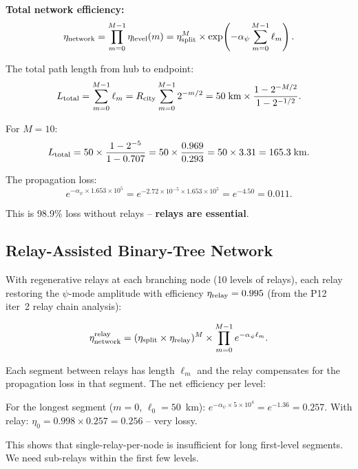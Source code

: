 \documentclass[aps,prd,twocolumn,superscriptaddress,nofootinbib]{revtex4-2}
\begin{document}
\textbf{Total network efficiency:}
\begin{equation}
\eta_{\rm network} = \prod_{m=0}^{M-1}\eta_{\rm level}(m)
= \eta_{\rm split}^M\times\exp\!\left(-\alpha_\psi\sum_{m=0}^{M-1}\ell_m\right).
\end{equation}

The total path length from hub to endpoint:
\begin{equation}
L_{\rm total} = \sum_{m=0}^{M-1}\ell_m
= R_{\rm city}\sum_{m=0}^{M-1}2^{-m/2}
= 50\;\text{km}\times\frac{1 - 2^{-M/2}}{1 - 2^{-1/2}}.
\end{equation}

For $M = 10$:
\begin{equation}
L_{\rm total} = 50\times\frac{1 - 2^{-5}}{1 - 0.707}
= 50\times\frac{0.969}{0.293} = 50\times3.31 = 165.3\;\si{km}.
\end{equation}

The propagation loss:
\begin{equation}
e^{-\alpha_\psi\times1.653\times10^5}
= e^{-2.72\times10^{-5}\times1.653\times10^5} = e^{-4.50} = 0.011.
\end{equation}

This is 98.9\% loss without relays -- \textbf{relays are essential}.

\subsection{Relay-Assisted Binary-Tree Network}

With regenerative relays at each branching node (10 levels of relays),
each relay restoring the $\psi$-mode amplitude with efficiency
$\eta_{\rm relay} = 0.995$ (from the P12 iter~2 relay chain analysis):

\begin{equation}
\eta_{\rm network}^{\rm relay}
= (\eta_{\rm split}\times\eta_{\rm relay})^M
\times\prod_{m=0}^{M-1}e^{-\alpha_\psi\ell_m}.
\end{equation}

Each segment between relays has length $\ell_m$ and the relay
compensates for the propagation loss in that segment. The net
efficiency per level:

For the longest segment ($m=0$, $\ell_0 = 50$~km):
$e^{-\alpha_\psi\times5\times10^4} = e^{-1.36} = 0.257$.
With relay: $\eta_0 = 0.998\times0.257 = 0.256$ -- very lossy.

This shows that single-relay-per-node is insufficient for long
first-level segments. We need sub-relays within the first few levels.
\end{document}
